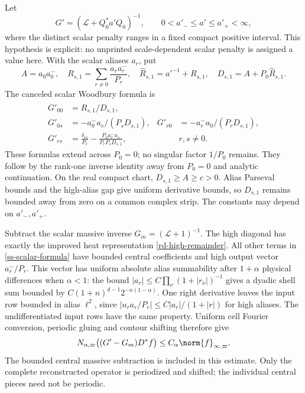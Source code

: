 Let
\[
 G'=(\mathcal L+Q_0^*a'Q_0)^{-1},\qquad
              0<a'_-\le a'\le a'_+<\infty,
\]
where the distinct scalar penalty ranges in a fixed compact
positive interval. This hypothesis is explicit: no unprinted
scale-dependent scalar penalty is assigned a value here.
With the scalar aliases $a_r$, put
\begin{equation}\label{ss-scalar-denominator}
 A=a_0a_0^-,\quad
 R_{s,1}=\sum_{r\ne0}\frac{a_ra_r^-}{P_r},\quad
 \widehat R_{s,1}=a'^{-1}+R_{s,1},\quad
 D_{s,1}=A+P_0\widehat R_{s,1}.
\end{equation}
The canceled scalar Woodbury formula is
\begin{align}
 G'_{00}&=\widehat R_{s,1}/D_{s,1},\nonumber\\
 G'_{0s}&=-a_0^-a_s/(P_sD_{s,1}),
 &G'_{r0}&=-a_r^-a_0/(P_rD_{s,1}),\nonumber\\
 G'_{rs}&=\frac{\delta_{rs}}{P_r}
       -\frac{P_0a_r^-a_s}{P_rP_sD_{s,1}},
 &&r,s\ne0.
 \label{ss-scalar-formula}
\end{align}
These formulas extend across $P_0=0$; no singular factor $1/P_0$
remains. They follow by the rank-one inverse identity away from
$P_0=0$ and analytic continuation. On the real compact chart,
$D_{s,1}\ge A\ge c>0$. Alias Parseval bounds and the high-alias
gap give uniform derivative bounds, so $D_{s,1}$ remains bounded
away from zero on a common complex strip. The constants may
depend on $a'_-,a'_+$.

Subtract the scalar massive inverse $G_m=(\mathcal L+1)^{-1}$.
The high diagonal has exactly the improved heat representation
\eqref{rd-high-remainder}. All other terms in
\eqref{ss-scalar-formula} have bounded central coefficients and
high output vector $a_r^-/P_r$. This vector has uniform absolute
alias summability after $1+\alpha$ physical differences when
$\alpha<1$: the bound
$|a_r|\le C\prod_\nu(1+|r_\nu|)^{-1}$ gives a dyadic shell sum
bounded by $C(1+n)^{d-1}2^{-n(1-\alpha)}$. One right derivative
leaves the input row bounded in alias $\ell^2$, since
$|u_ra_r/P_r|\le C|a_r|/(1+|r|)$ for high aliases.
The undifferentiated input rows have the same property.
Uniform cell Fourier conversion, periodic gluing and contour
shifting therefore give
\begin{equation}\label{ss-scalar-remainder}
 N_{\alpha,\varpi}\bigl((G'-G_m)D^*f\bigr)
       \le C_\alpha\norm{f}_{\infty,\varpi}.
\end{equation}
The bounded central massive subtraction is included in this
estimate. Only the complete reconstructed operator is periodized
and shifted; the individual central pieces need not be periodic.

